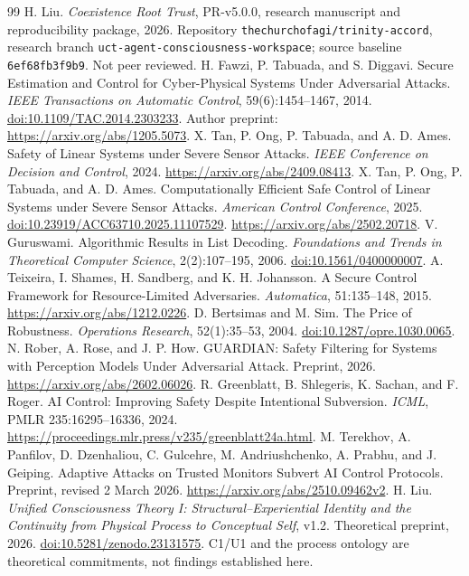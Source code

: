 \documentclass[11pt,a4paper]{article}
\theoremstyle{definition}\newtheorem{definition}{Definition}
\begin{document}
\clearpage
\begin{thebibliography}{99}\small
{} H. Liu. \emph{Coexistence Root Trust}, PR-v5.0.0, research manuscript and reproducibility package, 2026. Repository \texttt{thechurchofagi/trinity-accord}, research branch \texttt{uct-agent-consciousness-workspace}; source baseline \texttt{6ef68fb3f9b9}. Not peer reviewed.
 H. Fawzi, P. Tabuada, and S. Diggavi. Secure Estimation and Control for Cyber-Physical Systems Under Adversarial Attacks. \emph{IEEE Transactions on Automatic Control}, 59(6):1454--1467, 2014. \href{https://doi.org/10.1109/TAC.2014.2303233}{doi:10.1109/TAC.2014.2303233}. Author preprint: \url{https://arxiv.org/abs/1205.5073}.
 X. Tan, P. Ong, P. Tabuada, and A. D. Ames. Safety of Linear Systems under Severe Sensor Attacks. \emph{IEEE Conference on Decision and Control}, 2024. \url{https://arxiv.org/abs/2409.08413}.
 X. Tan, P. Ong, P. Tabuada, and A. D. Ames. Computationally Efficient Safe Control of Linear Systems under Severe Sensor Attacks. \emph{American Control Conference}, 2025. \href{https://doi.org/10.23919/ACC63710.2025.11107529}{doi:10.23919/ACC63710.2025.11107529}. \url{https://arxiv.org/abs/2502.20718}.
 V. Guruswami. Algorithmic Results in List Decoding. \emph{Foundations and Trends in Theoretical Computer Science}, 2(2):107--195, 2006. \href{https://doi.org/10.1561/0400000007}{doi:10.1561/0400000007}.
 A. Teixeira, I. Shames, H. Sandberg, and K. H. Johansson. A Secure Control Framework for Resource-Limited Adversaries. \emph{Automatica}, 51:135--148, 2015. \url{https://arxiv.org/abs/1212.0226}.
 D. Bertsimas and M. Sim. The Price of Robustness. \emph{Operations Research}, 52(1):35--53, 2004. \href{https://doi.org/10.1287/opre.1030.0065}{doi:10.1287/opre.1030.0065}.
 N. Rober, A. Rose, and J. P. How. GUARDIAN: Safety Filtering for Systems with Perception Models Under Adversarial Attack. Preprint, 2026. \url{https://arxiv.org/abs/2602.06026}.
 R. Greenblatt, B. Shlegeris, K. Sachan, and F. Roger. AI Control: Improving Safety Despite Intentional Subversion. \emph{ICML}, PMLR 235:16295--16336, 2024. \url{https://proceedings.mlr.press/v235/greenblatt24a.html}.
 M. Terekhov, A. Panfilov, D. Dzenhaliou, C. Gulcehre, M. Andriushchenko, A. Prabhu, and J. Geiping. Adaptive Attacks on Trusted Monitors Subvert AI Control Protocols. Preprint, revised 2 March 2026. \url{https://arxiv.org/abs/2510.09462v2}.
 H. Liu. \emph{Unified Consciousness Theory I: Structural--Experiential Identity and the Continuity from Physical Process to Conceptual Self}, v1.2. Theoretical preprint, 2026. \href{https://doi.org/10.5281/zenodo.23131575}{doi:10.5281/zenodo.23131575}. C1/U1 and the process ontology are theoretical commitments, not findings established here.
\end{thebibliography}
\end{document}
